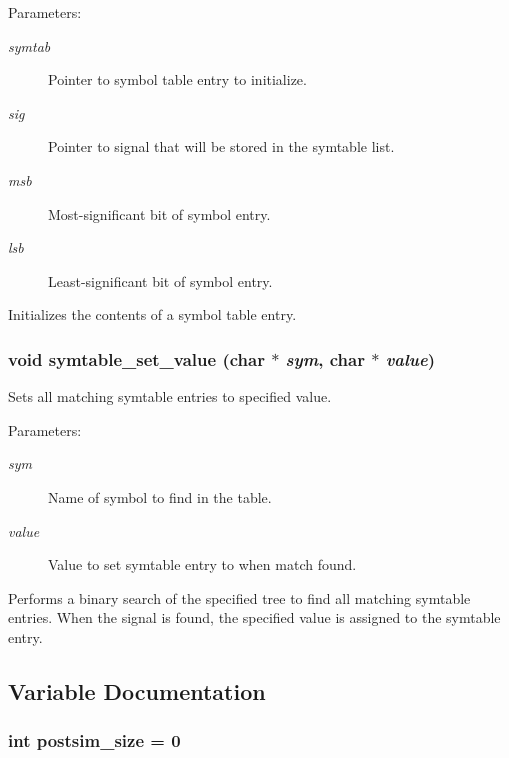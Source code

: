 \begin{Desc}
\item[Parameters:]
\begin{description}
\item[{\em symtab}]Pointer to symbol table entry to initialize. \item[{\em sig}]Pointer to signal that will be stored in the symtable list. \item[{\em msb}]Most-significant bit of symbol entry. \item[{\em lsb}]Least-significant bit of symbol entry.\end{description}
\end{Desc}
Initializes the contents of a symbol table entry. 
\subsubsection{\setlength{\rightskip}{0pt plus 5cm}void symtable\_\-set\_\-value (char $\ast$ {\em sym}, char $\ast$ {\em value})}\label{symtable_8c_a8}


Sets all matching symtable entries to specified value. 

\begin{Desc}
\item[Parameters:]
\begin{description}
\item[{\em sym}]Name of symbol to find in the table. \item[{\em value}]Value to set symtable entry to when match found.\end{description}
\end{Desc}
Performs a binary search of the specified tree to find all matching symtable entries. When the signal is found, the specified value is assigned to the symtable entry. 

\subsection{Variable Documentation}
\subsubsection{\setlength{\rightskip}{0pt plus 5cm}int {\bf postsim\_\-size} = 0}\label{symtable_8c_a4}


